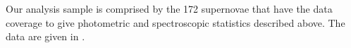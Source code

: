 \documentclass{aastex61}   	%
\begin{document}
Our analysis sample is comprised by the
172
supernovae that have the data coverage to 
give photometric and spectroscopic statistics described above.
The data are given in \citet{2017Chotard}.
%
%
%
\end{document}
